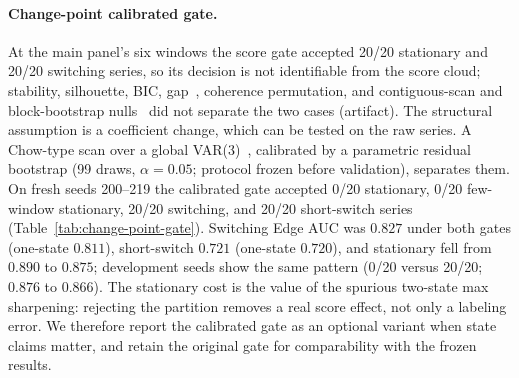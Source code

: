\documentclass[sigconf,anonymous]{acmart}
\begin{document}
\paragraph{Change-point calibrated gate.}
\label{sec:change-point-gate}
At the main panel's six windows the score gate accepted 20/20 stationary and 20/20 switching series, so its decision is not identifiable from the score cloud; stability, silhouette, BIC, gap~\cite{tibshirani2001estimating}, coherence permutation, and contiguous-scan and block-bootstrap nulls~\cite{politis1994stationary} did not separate the two cases (artifact).
The structural assumption is a coefficient change, which can be tested on the raw series.
A Chow-type scan over a global VAR(3)~\cite{chow1960tests,bai1998estimating}, calibrated by a parametric residual bootstrap (99 draws, $\alpha=0.05$; protocol frozen before validation), separates them.
On fresh seeds 200--219 the calibrated gate accepted 0/20 stationary, 0/20 few-window stationary, 20/20 switching, and 20/20 short-switch series (Table~\ref{tab:change-point-gate}).
Switching Edge AUC was $0.827$ under both gates (one-state $0.811$), short-switch $0.721$ (one-state $0.720$), and stationary fell from $0.890$ to $0.875$; development seeds show the same pattern (0/20 versus 20/20; $0.876$ to $0.866$).
The stationary cost is the value of the spurious two-state max sharpening: rejecting the partition removes a real score effect, not only a labeling error.
We therefore report the calibrated gate as an optional variant when state claims matter, and retain the original gate for comparability with the frozen results.

\begin{table}[t]
\caption{Frozen change-point gate on development and fresh validation seeds. ``Current'' is the score gate; ``Calibrated'' accepts the two-state partition when the VAR change-point bootstrap p-value is below 0.05. AUC is Edge AUC of the resulting scores.}
\label{tab:change-point-gate}
\centering
\small
\resizebox{\linewidth}{!}{}
\end{table}
\end{document}
